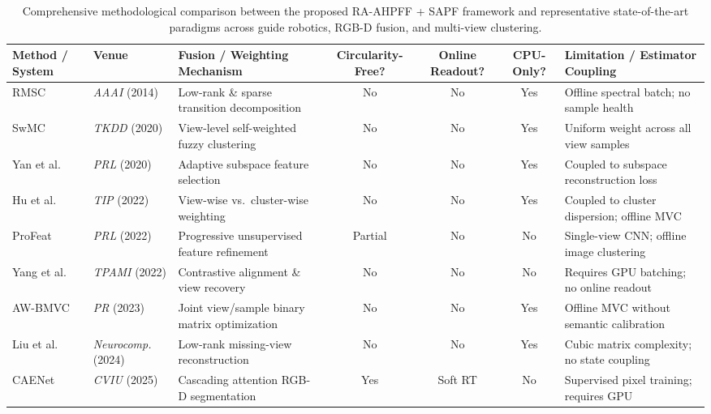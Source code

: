 \documentclass[11pt, a4paper]{article}
\begin{document}
\begin{table}[htbp]
    \centering
    \caption{Comprehensive methodological comparison between the proposed RA-AHPFF + SAPF framework and representative state-of-the-art paradigms across guide robotics, RGB-D fusion, and multi-view clustering.}
    \label{tab:sota_comparison}
    \scriptsize
    \setlength{\tabcolsep}{2.8pt}
    \renewcommand{\arraystretch}{0.95}
    \begin{tabularx}{\textwidth}{l l >{\raggedright\arraybackslash}X c c c >{\raggedright\arraybackslash}X}
        \toprule
        \textbf{Method / System} & \textbf{Venue} & \textbf{Fusion / Weighting Mechanism} & \textbf{Circularity-Free?} & \textbf{Online Readout?} & \textbf{CPU-Only?} & \textbf{Limitation / Estimator Coupling} \\
        \midrule
        RMSC \cite{xia2014robust} & \textit{AAAI} (2014) & Low-rank \& sparse transition decomposition & No & No & Yes & Offline spectral batch; no sample health \\
        SwMC \cite{zhu2020self} & \textit{TKDD} (2020) & View-level self-weighted fuzzy clustering & No & No & Yes & Uniform weight across all view samples \\
        Yan et al. \cite{yan2020adaptive} & \textit{PRL} (2020) & Adaptive subspace feature selection & No & No & Yes & Coupled to subspace reconstruction loss \\
        Hu et al. \cite{hu2022view} & \textit{TIP} (2022) & View-wise vs.\ cluster-wise weighting & No & No & Yes & Coupled to cluster dispersion; offline MVC \\
        ProFeat \cite{kim2022profeat} & \textit{PRL} (2022) & Progressive unsupervised feature refinement & Partial & No & No & Single-view CNN; offline image clustering \\
        Yang et al. \cite{yang2022robust} & \textit{TPAMI} (2022) & Contrastive alignment \& view recovery & No & No & No & Requires GPU batching; no online readout \\
        AW-BMVC \cite{houfar2023automatically} & \textit{PR} (2023) & Joint view/sample binary matrix optimization & No & No & Yes & Offline MVC without semantic calibration \\
        Liu et al. \cite{liu2024low} & \textit{Neurocomp.} (2024) & Low-rank missing-view reconstruction & No & No & Yes & Cubic matrix complexity; no state coupling \\
        CAENet \cite{tang2025cascading} & \textit{CVIU} (2025) & Cascading attention RGB-D segmentation & Yes & Soft RT & No & Supervised pixel training; requires GPU \\

\end{tabularx}
\end{table}
\end{document}
